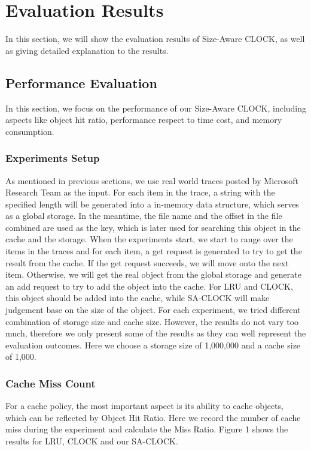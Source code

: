 \documentclass[conference]{IEEEtran}
\begin{document}
\section{Evaluation Results}
In this section, we will show the evaluation results of Size-Aware CLOCK, as well as giving detailed explanation to the results.

\subsection{Performance Evaluation}
In this section, we focus on the performance of our Size-Aware CLOCK, including aspects like object hit ratio, performance respect to time cost, and memory consumption.

\subsubsection{Experiments Setup}
As mentioned in previous sections, we use real world traces posted by Microsoft Research Team as the input. For each item in the trace, a string with the specified length will be generated into a in-memory data structure, which serves as a global storage. In the meantime, the file name and the offset in the file combined are used as the key, which is later used for searching this object in the cache and the storage. 
When the experiments start, we start to range over the items in the traces and for each item, a get request is generated to try to get the result from the cache. If the get request succeeds, we will move onto the next item. Otherwise, we will get the real object from the global storage and generate an add request to try to add the object into the cache. For LRU and CLOCK, this object should be added into the cache, while SA-CLOCK will make judgement base on the size of the object.
For each experiment, we tried different combination of storage size and cache size. However, the results do not vary too much, therefore we only present some of the results as they can well represent the evaluation outcomes. Here we choose a storage size of 1,000,000 and a cache size of 1,000.

\subsubsection{Cache Miss Count}
For a cache policy, the most important aspect is its ability to cache objects, which can be reflected by Object Hit Ratio. Here we record the number of cache miss during the experiment and calculate the Miss Ratio. Figure 1 shows the results for LRU, CLOCK and our SA-CLOCK. 
\end{document}
